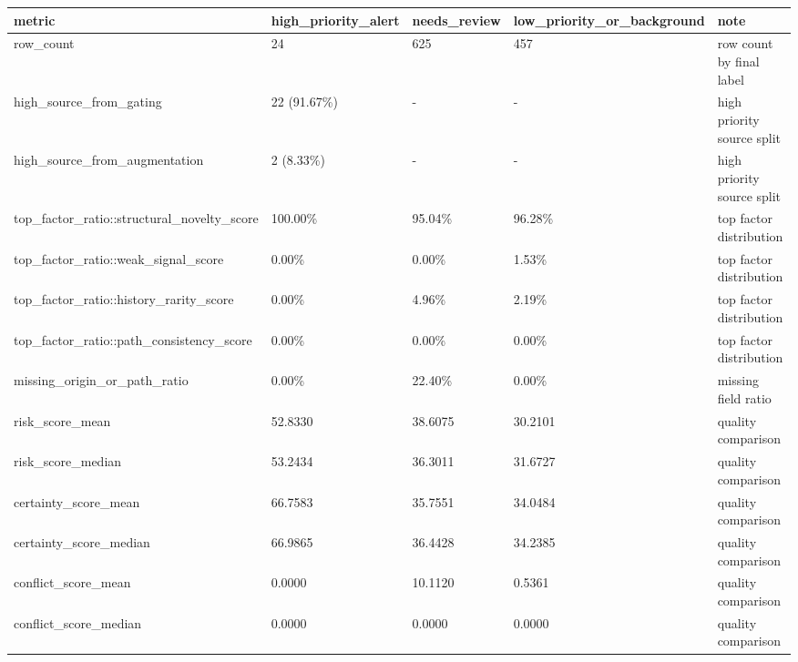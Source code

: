 ﻿\begin{tabular}{|l|l|l|l|l|}
\hline
metric & high\_priority\_alert & needs\_review & low\_priority\_or\_background & note \\
\hline
row\_count & 24 & 625 & 457 & row count by final label \\
\hline
high\_source\_from\_gating & 22 (91.67\%) & - & - & high priority source split \\
\hline
high\_source\_from\_augmentation & 2 (8.33\%) & - & - & high priority source split \\
\hline
top\_factor\_ratio::structural\_novelty\_score & 100.00\% & 95.04\% & 96.28\% & top factor distribution \\
\hline
top\_factor\_ratio::weak\_signal\_score & 0.00\% & 0.00\% & 1.53\% & top factor distribution \\
\hline
top\_factor\_ratio::history\_rarity\_score & 0.00\% & 4.96\% & 2.19\% & top factor distribution \\
\hline
top\_factor\_ratio::path\_consistency\_score & 0.00\% & 0.00\% & 0.00\% & top factor distribution \\
\hline
missing\_origin\_or\_path\_ratio & 0.00\% & 22.40\% & 0.00\% & missing field ratio \\
\hline
risk\_score\_mean & 52.8330 & 38.6075 & 30.2101 & quality comparison \\
\hline
risk\_score\_median & 53.2434 & 36.3011 & 31.6727 & quality comparison \\
\hline
certainty\_score\_mean & 66.7583 & 35.7551 & 34.0484 & quality comparison \\
\hline
certainty\_score\_median & 66.9865 & 36.4428 & 34.2385 & quality comparison \\
\hline
conflict\_score\_mean & 0.0000 & 10.1120 & 0.5361 & quality comparison \\
\hline
conflict\_score\_median & 0.0000 & 0.0000 & 0.0000 & quality comparison \\
\hline
\end{tabular}
